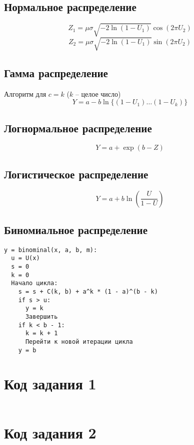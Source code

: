 \documentclass[bachelor, och, labwork]{SCWorks}
\begin{document}
\subsection{Нормальное распределение}
\[ Z_1 = \mu \sigma \sqrt{-2 \ln(1 - U_1)} \cos(2 \pi U_2) \]
\[ Z_2 = \mu \sigma \sqrt{-2 \ln(1 - U_1)} \sin(2 \pi U_2) \]

\subsection{Гамма распределение}
Алгоритм для $c = k$ ($k$ -- целое число)
\[ Y = a - b \ln \{(1 - U_1) \dots (1 - U_k)\} \]

\subsection{Логнормальное распределение}
\[ Y = a + \exp(b - Z) \]

\subsection{Логистическое распределение}
\[ Y = a + b \ln(\frac{U}{1 - U})\]

\subsection{Биномиальное распределение}

\begin{verbatim}
y = binominal(x, a, b, m):
  u = U(x)
  s = 0
  k = 0
  Начало цикла:
    s = s + C(k, b) + a^k * (1 - a)^(b - k)
    if s > u:
      y = k
      Завершить
    if k < b - 1:
      k = k + 1
      Перейти к новой итерации цикла
    y = b
\end{verbatim}

\newpage
\appendix
    \section{Код задания 1}
    \inputminted[fontsize=\footnotesize, linenos]{text}{../task1/generators.cpp}

    \section{Код задания 2}
    \inputminted[fontsize=\footnotesize, linenos]{text}{../task2/distribution.cpp}
\end{document}
